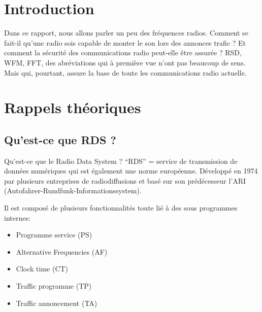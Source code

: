 \documentclass[a4paper]{article}
\begin{document}
\let\cleardoublepage\clearpage















\section{Introduction}





Dans ce rapport, nous allons parler un peu des fréquences radios. Comment se fait-il qu’une radio sois capable de monter le son lors des annonces trafic ? Et comment la sécurité des communications radio peut-elle être assurée ? RSD, WFM, FFT, des abréviations qui à première vue n’ont pas beaucoup de sens. Mais qui, pourtant, assure la base de toute les communications radio actuelle.















\section{Rappels théoriques}










\subsection{Qu’est-ce que RDS ?}





Qu’est-ce que le Radio Data System ? “RDS” = service de transmission de données numériques qui est également une norme européenne. Développé en 1974 par plusieurs entreprises de radiodiffusions et basé sur son prédécesseur l’ARI (Autofahrer-Rundfunk-Informationssystem).

Il est composé de plusieurs fonctionnalités toute lié à des sous programmes internes:
\begin{itemize}
    \item Programme service (PS)
    \item Alternative Frequencies (AF)
    \item Clock time (CT)
    \item Traffic programme (TP)
    \item Traffic annoncement (TA)    
\end{itemize}
 
\end{document}
